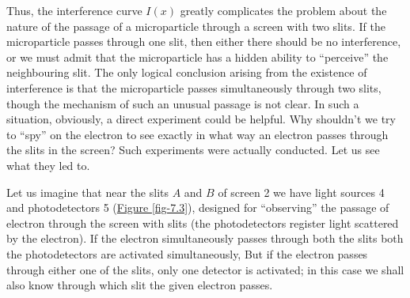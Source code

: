 \documentclass[a4paper,sfsidenotes,colorlinks=true]{tufte-book}
\numberwithin{equation}{section}
\numberwithin{figure}{section}
\begin{document}
Thus, the interference curve $I(x)$ greatly complicates the problem about the nature of the passage of a microparticle through a screen with two slits. If the microparticle passes through one slit, then either there should be no interference, or we must admit that the microparticle has a hidden ability to ``perceive'' the neighbouring slit. The only logical conclusion arising from the existence of interference is that the microparticle passes simultaneously through two slits, though the mechanism of such an unusual passage is not clear. In such a situation, obviously, a direct experiment could be helpful. Why shouldn't we try to ``spy'' on the electron to see exactly in what way an electron passes through the slits in the screen? Such experiments were actually conducted. Let us see what they led to.

Let  us imagine that near the slits $A$ and $B$ of screen \textsf{2} we have light sources \textsf{4} and photodetectors \textsf{5} (\hyperref[fig-7.3]{Figure \ref{fig-7.3}}), designed for ``observing'' the passage of electron through the screen with slits (the photodetectors register light scattered by the electron). If the electron simultaneously passes through both the slits both the photodetectors are activated simultaneously, But if the electron passes through either one of the slits, only one detector is activated; in this case we shall also know through which slit the given electron passes. 
\end{document}
